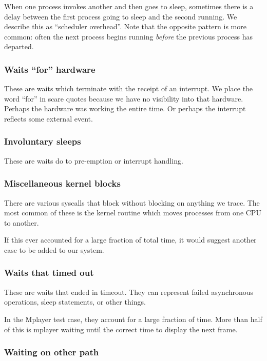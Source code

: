 \documentclass[10pt]{article}
\begin{document}
When one process invokes another and then goes to sleep, sometimes there is a delay between the first process going to sleep and the second running.  We describe this as ``scheduler overhead''.  Note that the opposite pattern is more common: often the next process begins running \emph{before} the previous process has departed.

\subsubsection{Waits ``for'' hardware}

These are waits which terminate with the receipt of an interrupt.  We place the word ``for'' in scare quotes because we have no visibility into that hardware.  Perhaps the hardware was working the entire time.  Or perhaps the interrupt reflects some external event.

\subsubsection{Involuntary sleeps}

These are waits do to pre-emption or interrupt handling.

\subsubsection{Miscellaneous kernel blocks}

There are various syscalls that block without blocking on anything we trace.  The most common of these is the kernel routine which moves processes from one CPU to another.

If this ever accounted for a large fraction of total time, it would suggest another case to be added to our system.

\subsubsection{Waits that timed out}

These are waits that ended in timeout.  They can represent failed asynchronous operations, sleep statements, or other things.

In the Mplayer test case, they account for a large fraction of time.  More than half of this is mplayer waiting until the correct time to display the next frame.

\subsubsection{Waiting on other path}
\end{document}
